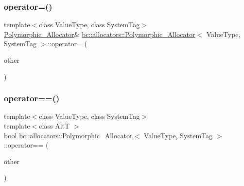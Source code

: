 \mbox{\label{structbc_1_1allocators_1_1Polymorphic__Allocator_a5154dccc457921adedc351e062f459df}} 
\subsubsection{\texorpdfstring{operator=()}{operator=()}\hspace{0.1cm}{\footnotesize\ttfamily [2/2]}}
{\footnotesize\ttfamily template$<$class Value\+Type, class System\+Tag$>$ \\
\hyperlink{structbc_1_1allocators_1_1Polymorphic__Allocator}{Polymorphic\+\_\+\+Allocator}\& \hyperlink{structbc_1_1allocators_1_1Polymorphic__Allocator}{bc\+::allocators\+::\+Polymorphic\+\_\+\+Allocator}$<$ Value\+Type, System\+Tag $>$\+::operator= (\begin{DoxyParamCaption}\item[{\hyperlink{structbc_1_1allocators_1_1Polymorphic__Allocator}{Polymorphic\+\_\+\+Allocator}$<$ Value\+Type, System\+Tag $>$ \&\&}]{other }\end{DoxyParamCaption})\hspace{0.3cm}{\ttfamily [inline]}}

\mbox{\label{structbc_1_1allocators_1_1Polymorphic__Allocator_a2162c3db4209225f13a046270efa3086}} 
\subsubsection{\texorpdfstring{operator==()}{operator==()}}
{\footnotesize\ttfamily template$<$class Value\+Type, class System\+Tag$>$ \\
template$<$class AltT $>$ \\
bool \hyperlink{structbc_1_1allocators_1_1Polymorphic__Allocator}{bc\+::allocators\+::\+Polymorphic\+\_\+\+Allocator}$<$ Value\+Type, System\+Tag $>$\+::operator== (\begin{DoxyParamCaption}\item[{const \hyperlink{structbc_1_1allocators_1_1Polymorphic__Allocator}{Polymorphic\+\_\+\+Allocator}$<$ AltT, \hyperlink{structbc_1_1allocators_1_1Polymorphic__Allocator_a8036f2439226926f10176abbe9ef6f9d}{system\+\_\+tag} $>$ \&}]{other }\end{DoxyParamCaption})\hspace{0.3cm}{\ttfamily [inline]}}

